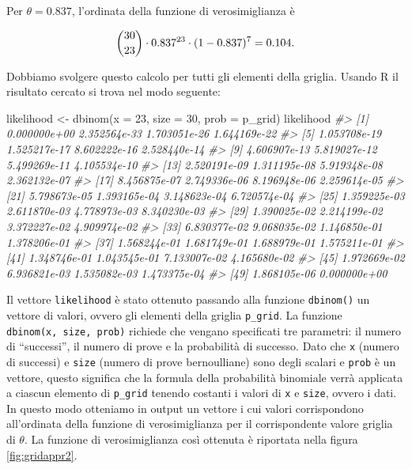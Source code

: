 \documentclass[
]{memoir}
\newenvironment{Shaded}{\begin{snugshade}}{\end{snugshade}}
\newcommand{\AttributeTok}[1]{\textcolor[rgb]{0.77,0.63,0.00}{#1}}
\newcommand{\CommentTok}[1]{\textcolor[rgb]{0.56,0.35,0.01}{\textit{#1}}}
\newcommand{\DecValTok}[1]{\textcolor[rgb]{0.00,0.00,0.81}{#1}}
\newcommand{\FunctionTok}[1]{\textcolor[rgb]{0.00,0.00,0.00}{#1}}
\newcommand{\NormalTok}[1]{#1}
\newcommand{\OtherTok}[1]{\textcolor[rgb]{0.56,0.35,0.01}{#1}}
\begin{document}
\noindent
Per \(\theta = 0.837\), l'ordinata della funzione di verosimiglianza è

\begin{equation}
\binom{30}{23} \cdot 0.837^{23} \cdot (1 - 0.837)^{7} = 0.104.\notag
\end{equation}

\noindent
Dobbiamo svolgere questo calcolo per tutti gli elementi della griglia. Usando R il risultato cercato si trova nel modo seguente:

\begin{Shaded}
\begin{Highlighting}[]
\NormalTok{likelihood }\OtherTok{\textless{}{-}} \FunctionTok{dbinom}\NormalTok{(}\AttributeTok{x =} \DecValTok{23}\NormalTok{, }\AttributeTok{size =} \DecValTok{30}\NormalTok{, }\AttributeTok{prob =}\NormalTok{ p\_grid)}
\NormalTok{likelihood}
\CommentTok{\#\textgreater{}  [1] 0.000000e+00 2.352564e{-}33 1.703051e{-}26 1.644169e{-}22}
\CommentTok{\#\textgreater{}  [5] 1.053708e{-}19 1.525217e{-}17 8.602222e{-}16 2.528440e{-}14}
\CommentTok{\#\textgreater{}  [9] 4.606907e{-}13 5.819027e{-}12 5.499269e{-}11 4.105534e{-}10}
\CommentTok{\#\textgreater{} [13] 2.520191e{-}09 1.311195e{-}08 5.919348e{-}08 2.362132e{-}07}
\CommentTok{\#\textgreater{} [17] 8.456875e{-}07 2.749336e{-}06 8.196948e{-}06 2.259614e{-}05}
\CommentTok{\#\textgreater{} [21] 5.798673e{-}05 1.393165e{-}04 3.148623e{-}04 6.720574e{-}04}
\CommentTok{\#\textgreater{} [25] 1.359225e{-}03 2.611870e{-}03 4.778973e{-}03 8.340230e{-}03}
\CommentTok{\#\textgreater{} [29] 1.390025e{-}02 2.214199e{-}02 3.372227e{-}02 4.909974e{-}02}
\CommentTok{\#\textgreater{} [33] 6.830377e{-}02 9.068035e{-}02 1.146850e{-}01 1.378206e{-}01}
\CommentTok{\#\textgreater{} [37] 1.568244e{-}01 1.681749e{-}01 1.688979e{-}01 1.575211e{-}01}
\CommentTok{\#\textgreater{} [41] 1.348746e{-}01 1.043545e{-}01 7.133007e{-}02 4.165680e{-}02}
\CommentTok{\#\textgreater{} [45] 1.972669e{-}02 6.936821e{-}03 1.535082e{-}03 1.473375e{-}04}
\CommentTok{\#\textgreater{} [49] 1.868105e{-}06 0.000000e+00}
\end{Highlighting}
\end{Shaded}

\noindent
Il vettore \texttt{likelihood} è stato ottenuto passando alla funzione \texttt{dbinom()} un vettore di valori, ovvero gli elementi della griglia \texttt{p\_grid}. La funzione \texttt{dbinom(x,\ size,\ prob)} richiede che vengano specificati tre parametri: il numero di ``successi'', il numero di prove e la probabilità di successo. Dato che \texttt{x} (numero di successi) e \texttt{size} (numero di prove bernoulliane) sono degli scalari e \texttt{prob} è un vettore, questo significa che la formula della probabilità binomiale verrà applicata a ciascun elemento di \texttt{p\_grid} tenendo costanti i valori di \texttt{x} e \texttt{size}, ovvero i dati. In questo modo otteniamo in output un vettore i cui valori corrispondono all'ordinata della funzione di verosimiglianza per il corrispondente valore griglia di \(\theta\). La funzione di verosimiglianza così ottenuta è riportata nella figura \ref{fig:gridappr2}.
\end{document}
